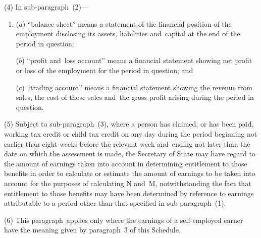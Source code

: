 \documentclass[12pt,a4paper]{article}
\begin{document}
(4) In sub-paragraph~(2)—
\begin{enumerate}\item[]
($a$) “balance sheet” means a statement of the financial position of the employment disclosing its assets, liabilities and~capital at the end of the period in question;

($b$) “profit and~loss account” means a financial statement showing net profit or loss of the employment for the period in question; and

($c$) “trading account” means a financial statement showing the revenue from sales, the cost of those sales and~the gross profit arising during the period in question.
\end{enumerate}

(5) Subject to sub-paragraph~(3), where a person has claimed, or has been paid, 
working tax credit or child tax credit  %
on any day during the period beginning not earlier than eight weeks before the relevant week and~ending not later than the date on which the assessment is made, the 
Secretary of State  %
may have regard to the amount of earnings taken into account in determining entitlement to those benefits in order to calculate or estimate the amount of earnings to be taken into account for the purposes of calculating N and~M, notwithstanding the fact that entitlement to those benefits may have been determined by reference to earnings attributable to a period other than that specified in sub-paragraph~(1).

(6) This paragraph~applies only where the earnings of a self-employed earner have the meaning given by paragraph~3 of this Schedule.
\end{document}
